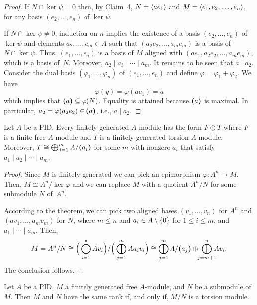 \begin{proof}
\bigskip

If $N\cap\ker\psi=0$ then, by Claim~4, $N=\langle ae_1\rangle$ and $M=\langle e_1,e_2,\dots,e_n\rangle$, for any basis $(e_2,\dots,e_n)$ of $\ker\psi$.

If $N\cap\ker\psi\ne0$, induction on $n$ implies the existence of a basis $(e_2,\dots,e_n)$ of $\ker\psi$ and elements $a_2,\dots,a_m\in A$ such that $(a_2e_2,\dots,a_me_m)$ is a basis of $N\cap\ker\psi$. Thus, $(e_1,\dots,e_n)$ is a basis of $M$ aligned with $(ae_1,a_2e_2,\dots,a_me_m)$, which is a basis of~$N$. Moreover, $a_2\mid a_3\mid\cdots\mid a_m$. It remains to be seen that $a\mid a_2$. Consider the dual basis $(\varphi_1,\dots,\varphi_n)$ of $(e_1,\dots,e_n)$ and define $\varphi=\varphi_1+\varphi_2$. We have
$$
    \varphi(y)= \varphi(ae_1)=a
$$
which implies that $\textrm{\boldmath$($}a\textrm{\boldmath$)$}\subseteq\varphi(N)$. Equality is attained because $\textrm{\boldmath$($}a\textrm{\boldmath$)$}$ is maximal. In particular, $a_2=\varphi(a_2e_2)\in\textrm{\boldmath$($}a\textrm{\boldmath$)$}$, i.e., $a\mid a_2$.
\end{proof}


\begin{cor}\label{cor:M=Mfree+Mtor}
    Let $A$ be a PID. Every finitely generated\/ $A$-module has the form\/ $F \oplus T$ where\/ $F$ is a finite free\/ $A$-module and\/ $T$ is a finitely generated torsion\/ $A$-module. Moreover, $T \cong \bigoplus_{j=1}^m A/\textrm{\boldmath$($}a_j\textrm{\boldmath$)$}$ for some\/ $m$ with nonzero\/ $a_i$ that satisfy $a_1\mid a_2\mid\cdots\mid a_m$.
\end{cor}

\begin{proof}
    Since $M$ is finitely generated we can pick an epimorphism $\varphi\colon A^n\to M$. Then, $M\cong A^n/\ker\varphi$ and we can replace $M$ with a quotient $A^n/N$ for some submodule $N$ of~$A^n$.
    
    According to the theorem, we can pick two aligned bases $(v_1,\dots,v_n)$ for $A^n$ and $(av_1,\dots,a_mv_m)$ for $N$, where $m\le n$ and $a_i\in A\setminus\{0\}$ for $1\le i\le m$, and $a_1\mid \cdots\mid a_m$. Then,
    \begin{equation}\label{eq:torsion+free-decomposition}
        M=A^n/N\cong\Big(\bigoplus_{i=1}^nAv_i\Big)
            /\Big(\bigoplus_{j=1}^mAa_iv_i\Big)
            \cong\bigoplus_{j=1}^mA/\textrm{\boldmath$($}a_j\textrm{\boldmath$)$}\oplus
                \!\!\bigoplus_{j=m+1}^n
                    \!\!\!Av_i.
    \end{equation}
    The conclusion follows.
\end{proof}

\begin{cor}\label{cor:rank-characterization}
    Let\/ $A$ be a PID, $M$ a finitely generated free\/ $A$-module, and\/ $N$ be a submodule of\/ $M$. Then\/ $M$ and\/ $N$ have the same rank if, and only if, $M/N$ is a torsion module.
\end{cor}

